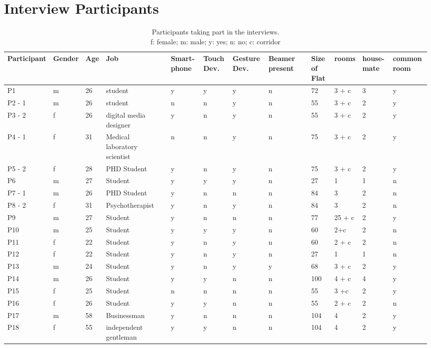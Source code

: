\begin{sidewaystable}
\section{Interview Participants}
\begin{tabular}{@{}l l l p{2cm} lp{1cm} p{1cm} p{1cm}p{1cm} l p{1cm} l p{1cm} p{1cm}@{} } %
\toprule
Participant  & Gender & Age & Job &  & Smart-phone & Touch Dev. & Gesture Dev. & Beamer present &  & Size of Flat & rooms & house-mate & common room \\
\midrule
P1 & m & 26 & student &  & y & y & y & n &  & 72 & 3 + c & 3 & y \\
P2 - 1 & m & 26 & student  &  & n & n & y & n &  & 55 & 3 + c & 2 & y \\
P3 - 2 & f & 26 & digital media designer &  & y & n & y & n &  & 55 & 3 + c & 2 & y \\
P4 - 1 & f & 31 & Medical laboratory scientist &  & n & n & y & n &  & 75 & 3 + c  & 2 & y \\
P5 - 2 & f & 28 & PHD Student  &  & y & n & y & n &  & 75 & 3 + c & 2 & y \\
P6 & m & 27 & Student &  & y & y & y & n &  & 27 & 1 & 1 & n \\
P7 - 1 & m & 26 & PHD Student &  & y & n & n & n &  & 84 & 3 & 2 & n \\
P8 - 2 & f & 31 & Psychotherapist &  & y & n & y & n &  & 84 & 3 & 2 & n \\
P9 & m & 27 & Student &  & y & n & n & n &  & 77 & 25 + c & 2 & y \\
P10 & m & 25 & Student  &  & y & y & y & n &  & 60 & 2+c & 2 & n \\
P11 & f & 22 & Student &  & y & n & y & n &  & 60 & 2 + c & 2 & n \\
P12 & f & 22 & Student &  & y & n & y & n &  & 27 & 1 & 1 & n \\
P13 & m & 24 & Student  &  & y & n & y & y &  & 68 & 3 + c  & 2 & y \\
P14 & m & 26 & Student &  & y & y & n & n &  & 100 & 4 + c & 4 & y \\
P15 & f & 25 & Student  &  & n & n & n & n &  & 55 & 3 +c  & 2 & y \\
P16 & f & 26 & Student  &  & y & y & n & n &  & 55 & 2 + c  & 2 & n \\
P17 & m & 58 & Businessman &  & y & n & n & n &  & 104 & 4 & 2 & y \\
P18 & f & 55 & independent gentleman &  & y & y & n & n &  & 104 & 4 & 2 & y \\
\bottomrule
\end{tabular}
\caption{Participants taking part in the interviews.\\ f: female; m: male; y: yes; n: no; c: corridor}
\label{tab_participants}
\end{sidewaystable}